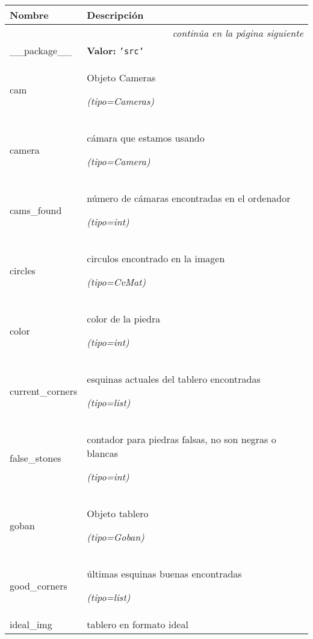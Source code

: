    \vspace{-1cm}
\hspace{\varindent}\begin{longtable}{|p{\varnamewidth}|p{\vardescrwidth}|l}
\cline{1-2}
\cline{1-2} \centering \textbf{Nombre} & \centering \textbf{Descripción}& \\
\cline{1-2}
\endhead\cline{1-2}\multicolumn{3}{r}{\small\textit{continúa en la página siguiente}}\\\endfoot\cline{1-2}
\endlastfoot\raggedright \_\-\_\-p\-a\-c\-k\-a\-g\-e\-\_\-\_\- & \raggedright \textbf{Valor:} 
{\tt \texttt{'}\texttt{src}\texttt{'}}&\\
\cline{1-2}
\raggedright c\-a\-m\- & \raggedright Objeto Cameras

            {\it (tipo=Cameras)}&\\
\cline{1-2}
\raggedright c\-a\-m\-e\-r\-a\- & \raggedright cámara que estamos usando

            {\it (tipo=Camera)}&\\
\cline{1-2}
\raggedright c\-a\-m\-s\-\_\-f\-o\-u\-n\-d\- & \raggedright número de cámaras encontradas en el ordenador

            {\it (tipo=int)}&\\
\cline{1-2}
\raggedright c\-i\-r\-c\-l\-e\-s\- & \raggedright circulos encontrado en la imagen

            {\it (tipo=CvMat)}&\\
\cline{1-2}
\raggedright c\-o\-l\-o\-r\- & \raggedright color de la piedra

            {\it (tipo=int)}&\\
\cline{1-2}
\raggedright c\-u\-r\-r\-e\-n\-t\-\_\-c\-o\-r\-n\-e\-r\-s\- & \raggedright esquinas actuales del tablero encontradas

            {\it (tipo=list)}&\\
\cline{1-2}
\raggedright f\-a\-l\-s\-e\-\_\-s\-t\-o\-n\-e\-s\- & \raggedright contador para piedras falsas, no son negras o blancas

            {\it (tipo=int)}&\\
\cline{1-2}
\raggedright g\-o\-b\-a\-n\- & \raggedright Objeto tablero

            {\it (tipo=Goban)}&\\
\cline{1-2}
\raggedright g\-o\-o\-d\-\_\-c\-o\-r\-n\-e\-r\-s\- & \raggedright últimas esquinas buenas encontradas

            {\it (tipo=list)}&\\
\cline{1-2}
\raggedright i\-d\-e\-a\-l\-\_\-i\-m\-g\- & \raggedright tablero en formato ideal


\end{longtable}
